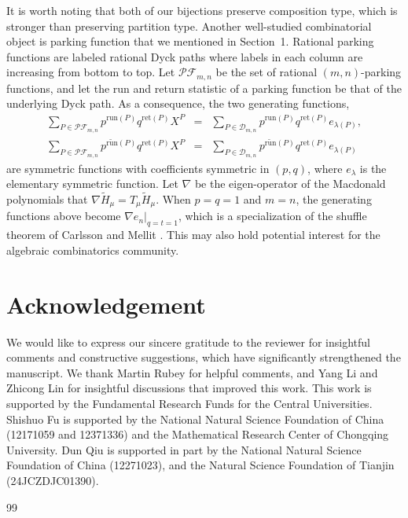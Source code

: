 \documentclass[11pt,a4paper,reqno]{article}
\newcommand{\DD}{\mathcal{D}}
\newcommand{\run}{\mathrm{run}}
\newcommand{\runb}{\widetilde{{\mathrm{run}}}}
\newcommand{\ret}{\mathrm{ret}}
\newcommand{\la}{\lambda}
\begin{document}
{	It is worth noting that both of our bijections preserve composition type, which is stronger than preserving partition type. Another well-studied combinatorial object is parking function that we mentioned in Section~1. Rational parking functions are labeled rational Dyck paths where labels in each column are increasing from bottom to top. Let $\mathcal{PF}_{m,n}$ be the set of rational $(m,n)$-parking functions, and let the run and return statistic of a parking function be that of the underlying Dyck path. As a consequence, the two generating functions, 
	\begin{eqnarray*}
		\sum_{P\in\mathcal{PF}_{m,n}} p^{\run(P)}q^{\ret(P)}X^P &=& \sum_{P \in \DD_{m,n}}p^{\run(P)}q^{\ret(P)}e_{\lambda(P)},\\
		\sum_{P\in\mathcal{PF}_{m,n}} p^{\runb(P)}q^{\ret(P)}X^P &=& \sum_{P \in \DD_{m,n}}p^{\runb(P)}q^{\ret(P)}e_{\lambda(P)}
	\end{eqnarray*}
	are symmetric functions with coefficients symmetric in $(p,q)$, where $e_\la$ is the elementary symmetric function. Let $\nabla$ be the eigen-operator of the Macdonald polynomials that $\nabla \tilde{H}_\mu = T_\mu \tilde{H}_\mu.$
	When $p=q=1$ and $m=n$, the generating functions above become $\nabla e_n|_{q=t=1}$, which is a specialization of the shuffle theorem of Carlsson and Mellit \cite{Car}. This may also hold potential interest for the algebraic combinatorics community.
	
	
	
	\section*{Acknowledgement}
	
	We would like to express our sincere gratitude to the reviewer for insightful comments and constructive suggestions, which have significantly strengthened the manuscript. We thank Martin Rubey for helpful comments, and Yang Li and Zhicong Lin for insightful discussions that improved this work. This work is supported by the Fundamental Research Funds for the Central Universities. Shishuo Fu is supported by the National Natural Science Foundation of China (12171059 and 12371336) and the Mathematical Research Center of Chongqing University.
	Dun Qiu is supported in part by the National Natural Science Foundation of China (12271023), and the Natural Science Foundation of Tianjin (24JCZDJC01390).
	
	
	\begin{thebibliography}{99}
		

\end{thebibliography}}
\end{document}
